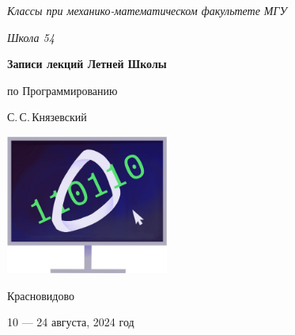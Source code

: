 \documentclass[a5paper, 10pt, twoside]{article}
\begin{document}
\begin{titlepage}
    \centering
    \vspace*{\fill}
    
    {\sl\large Классы при механико-математическом факультете МГУ} \medskip

    {\sl\large Школа 54}

    \vspace*{4cm}

    \begin{spacing}{1}
        \LARGE\bfseries Записи лекций Летней Школы\par по Программированию
    \end{spacing}
    \smallskip
    
    {\Large С.\,С.\,Князевский}
    \vspace{.6cm}
    
    \includegraphics[width=0.4\textwidth]{img/logo.jpg}

    \vspace*{4cm}

    {\large Красновидово}\medskip
    
    {\large 10 --- 24 августа, 2024 год}
    \vspace*{\fill}
\end{titlepage}

\thispagestyle{empty}

\begin{abstract}
    Данные материалы являются конспектом лекций, прочитанных в Летней школе по программированию в 2024\,г. Сергеем Сергеевичем Князевским и студентами механико-математического факультета МГУ им. М.\,В.\,Ломоносова: Пшеничным Никитой, Клочковым Иваном и Хакамовым Рамилем. Представленные в данной брошюре темы были выбраны с целью подготовки к олимпиадам по программированию различного уровня, начиная со школьного и заканчивая всероссийским.

    Набор осуществлял Пшеничный Никита при участии Льва Целомудрова. За редактуру и вычитку спасибо Сергею Сергеевичу Князевскому.
\end{abstract}
\end{document}
